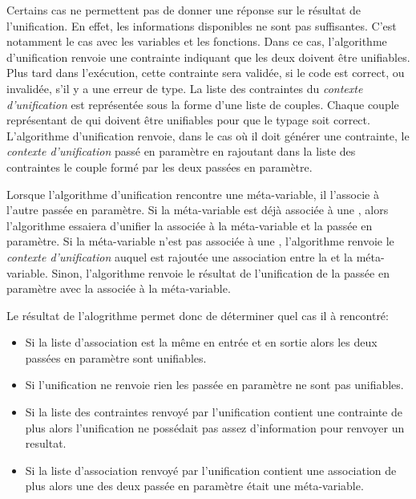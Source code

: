                 Certains cas ne permettent pas de donner une réponse sur le résultat de l'unification. En effet, les informations disponibles
                ne sont pas suffisantes. C'est notamment le cas avec les variables et les fonctions.
                Dans ce cas, l'algorithme d'unification renvoie une contrainte indiquant que les deux \lexp{} doivent être unifiables.
                Plus tard dans l'exécution, cette contrainte sera validée, si le code est correct, ou invalidée, s'il y a une erreur de type.
                La liste des contraintes du \textit{contexte d'unification} est représentée sous la forme d'une liste de couples.
                Chaque couple représentant de \lexp{} qui doivent être unifiables pour que le typage soit correct.
                L'algorithme d'unification renvoie, dans le cas où il doit générer une contrainte, le \textit{contexte d'unification} passé en paramètre
                en rajoutant dans la liste des contraintes le couple formé par les deux \lexp{} passées en paramètre.

                Lorsque l'algorithme d'unification rencontre une méta-variable, il l'associe à l'autre \lexp{} passée en paramètre.
                Si la méta-variable est déjà associée à une \lexp{}, alors l'algorithme essaiera d'unifier la \lexp{} associée à la méta-variable
                et la \lexp{} passée en paramètre.
                Si la méta-variable n'est pas associée à une \lexp{}, l'algorithme renvoie le \textit{contexte d'unification} auquel est rajoutée une
                association entre la \lexp{} et la méta-variable. Sinon, l'algorithme renvoie le résultat de l'unification de la \lexp{} passée en paramètre
                avec la \lexp{} associée à la méta-variable.

                Le résultat de l'alogrithme permet donc de déterminer quel cas il à rencontré:
                \begin{itemize}
                    \item Si la liste d'association est la même en entrée et en sortie alors les deux \lexp{} passées en paramètre sont unifiables.
                    \item Si l'unification ne renvoie rien les \lexp{} passée en paramètre ne sont pas unifiables.
                    \item Si la liste des contraintes renvoyé par l'unification contient une contrainte de plus alors l'unification ne possédait pas assez d'information pour renvoyer un resultat.
                    \item Si la liste d'association renvoyé par l'unification contient une association de plus alors une des deux \lexp{} passée en paramètre était une méta-variable.
                \end{itemize}

